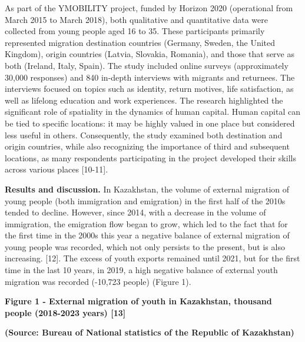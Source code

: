 {As part of the YMOBILITY project, funded by Horizon 2020 (operational
from March 2015 to March 2018), both qualitative and quantitative data
were collected from young people aged 16 to 35. These participants
primarily represented migration destination countries (Germany, Sweden,
the United Kingdom), origin countries (Latvia, Slovakia, Romania), and
those that serve as both (Ireland, Italy, Spain). The study included
online surveys (approximately 30,000 responses) and 840 in-depth
interviews with migrants and returnees. The interviews focused on topics
such as identity, return motives, life satisfaction, as well as lifelong
education and work experiences. The research highlighted the significant
role of spatiality in the dynamics of human capital. Human capital can
be tied to specific locations: it may be highly valued in one place but
considered less useful in others. Consequently, the study examined both
destination and origin countries, while also recognizing the importance
of third and subsequent locations, as many respondents participating in
the project developed their skills across various places {[}10-11{]}.

{\bfseries Results and discussion.} In Kazakhstan, the volume of external
migration of young people (both immigration and emigration) in the first
half of the 2010s tended to decline. However, since 2014, with a
decrease in the volume of immigration, the emigration flow began to
grow, which led to the fact that for the first time in the 2000s this
year a negative balance of external migration of young people was
recorded, which not only persists to the present, but is also
increasing. {[}12{]}. The excess of youth exports remained until 2021,
but for the first time in the last 10 years, in 2019, a high negative
balance of external youth migration was recorded (-10,723 people)
(Figure 1).

{\bfseries Figure 1 - External migration of youth in Kazakhstan, thousand
people (2018-2023 years) {[}13{]}}

{\bfseries (Source: Bureau of National statistics of the Republic of
Kazakhstan)}

}
